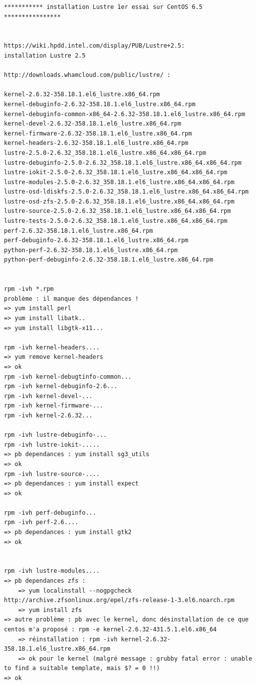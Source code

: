 \documentclass[12pt]{article}
\begin{document}
\begin{verbatim}
*********** installation Lustre 1er essai sur CentOS 6.5 ****************


https://wiki.hpdd.intel.com/display/PUB/Lustre+2.5:
installation Lustre 2.5

http://downloads.whamcloud.com/public/lustre/ :

kernel-2.6.32-358.18.1.el6_lustre.x86_64.rpm
kernel-debuginfo-2.6.32-358.18.1.el6_lustre.x86_64.rpm
kernel-debuginfo-common-x86_64-2.6.32-358.18.1.el6_lustre.x86_64.rpm
kernel-devel-2.6.32-358.18.1.el6_lustre.x86_64.rpm
kernel-firmware-2.6.32-358.18.1.el6_lustre.x86_64.rpm
kernel-headers-2.6.32-358.18.1.el6_lustre.x86_64.rpm
lustre-2.5.0-2.6.32_358.18.1.el6_lustre.x86_64.x86_64.rpm
lustre-debuginfo-2.5.0-2.6.32_358.18.1.el6_lustre.x86_64.x86_64.rpm
lustre-iokit-2.5.0-2.6.32_358.18.1.el6_lustre.x86_64.x86_64.rpm
lustre-modules-2.5.0-2.6.32_358.18.1.el6_lustre.x86_64.x86_64.rpm
lustre-osd-ldiskfs-2.5.0-2.6.32_358.18.1.el6_lustre.x86_64.x86_64.rpm
lustre-osd-zfs-2.5.0-2.6.32_358.18.1.el6_lustre.x86_64.x86_64.rpm
lustre-source-2.5.0-2.6.32_358.18.1.el6_lustre.x86_64.x86_64.rpm
lustre-tests-2.5.0-2.6.32_358.18.1.el6_lustre.x86_64.x86_64.rpm
perf-2.6.32-358.18.1.el6_lustre.x86_64.rpm
perf-debuginfo-2.6.32-358.18.1.el6_lustre.x86_64.rpm
python-perf-2.6.32-358.18.1.el6_lustre.x86_64.rpm
python-perf-debuginfo-2.6.32-358.18.1.el6_lustre.x86_64.rpm


rpm -ivh *.rpm
problème : il manque des dépendances !
=> yum install perl
=> yum install libatk..
=> yum install libgtk-x11...

rpm -ivh kernel-headers....
=> yum remove kernel-headers
=> ok
rpm -ivh kernel-debugtinfo-common...
rpm -ivh kernel-debuginfo-2.6...
rpm -ivh kernel-devel-...
rpm -ivh kernel-firmware-...
rpm -ivh kernel-2.6.32...

rpm -ivh lustre-debuginfo-...
rpm -ivh lustre-iokit-..... 
=> pb dependances : yum install sg3_utils 
=> ok
rpm -ivh lustre-source-.... 
=> pb dependances : yum install expect 
=> ok

rpm -ivh perf-debuginfo...
rpm -ivh perf-2.6.... 
=> pb dependances : yum install gtk2 
=> ok


rpm -ivh lustre-modules.... 
=> pb dependances zfs : 
	=> yum localinstall --nogpgcheck http://archive.zfsonlinux.org/epel/zfs-release-1-3.el6.noarch.rpm
	=> yum install zfs 
=> autre problème : pb avec le kernel, donc désinstallation de ce que centos m'a proposé : rpm -e kernel-2.6.32-431.5.1.el6.x86_64
	=> réinstallation : rpm -ivh kernel-2.6.32-358.18.1.el6_lustre.x86_64.rpm 
	=> ok pour le kernel (malgré message : grubby fatal error : unable to find a suitable template, mais $? = 0 !!)
=> ok


\end{verbatim}
\end{document}
